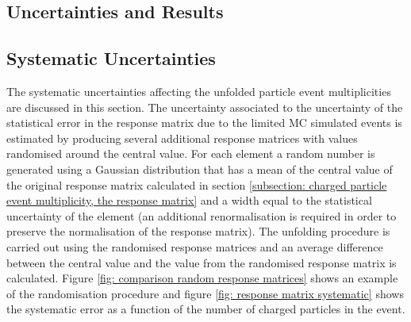 \subsection{Uncertainties and Results}
\label{subsection: charged particle event multiplicity, uncertainties and results}

\subsection*{Systematic Uncertainties}

The systematic uncertainties affecting the unfolded particle event multiplicities are discussed in this section. The uncertainty associated to the uncertainty of the statistical error in the response matrix due to the limited MC simulated events is estimated by producing several additional response matrices with values randomised around the central value. For each element a random number is generated using a Gaussian distribution that has a mean of the central value of the original response matrix calculated in section \ref{subsection: charged particle event multiplicity, the response matrix} and a width equal to the statistical uncertainty of the element (an additional renormalisation is required in order to preserve the normalisation of the response matrix). The unfolding procedure is carried out using the randomised response matrices and an average difference between the central value and the value from the randomised response matrix is calculated. Figure \ref{fig: comparison random response matrices} shows an example of the randomisation procedure and figure \ref{fig: response matrix systematic} shows the systematic error as a function of the number of charged particles in the event.


